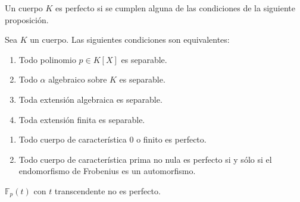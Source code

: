 \begin{definition}
Un cuerpo $K$ es perfecto si se cumplen alguna de las condiciones de la siguiente proposición. 
\end{definition}

\begin{proposition}
Sea $K$ un cuerpo. Las siguientes condiciones son equivalentes:

\begin{enumerate}
\item Todo polinomio $p \in K[X]$ es separable.
\item Todo $\alpha$ algebraico sobre $K$ es separable. 
\item Toda extensión algebraica es separable.
\item Toda extensión finita es separable.
\end{enumerate}
\end{proposition}

\begin{proposition}
\begin{enumerate}
\item Todo cuerpo de característica 0 o finito es perfecto. 
\item Todo cuerpo de característica prima no nula es perfecto si y sólo si el endomorfismo de Frobenius es un automorfismo. 
\end{enumerate}
\end{proposition}

\begin{example}
$\mathbb{F}_p(t)$ con $t$ transcendente no es perfecto. 
\end{example}











